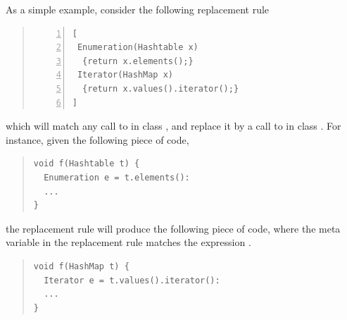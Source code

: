 As a simple example, consider the following replacement rule
\begin{quote}
\begin{lstlisting}[numbers=left]
[ 
 Enumeration(Hashtable x) 
  {return x.elements();}
 Iterator(HashMap x) 
  {return x.values().iterator();} 
]
\end{lstlisting}
\end{quote}
which will match any call to  in class , and replace it by a call to  in class . 
For instance, given the following piece of code,
\begin{quote}
\begin{lstlisting}
void f(Hashtable t) {
  Enumeration e = t.elements():
  ...
}
\end{lstlisting}
\end{quote}
the replacement rule will produce the following piece of code, where
the meta variable  in the replacement rule matches the expression .
\begin{quote}
\begin{lstlisting}
void f(HashMap t) {
  Iterator e = t.values().iterator():
  ...
}
\end{lstlisting}
\end{quote}



